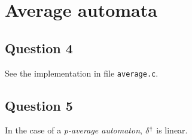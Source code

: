 \section{Average automata}


\subsection*{Question 4}
 
 See the implementation in file \texttt{average.c}.
  

\subsection*{Question 5}
 
\begin{prop}
 In the case of a \textit{p-average automaton}, $\delta^{\dag}$ is linear.
\end{prop}

